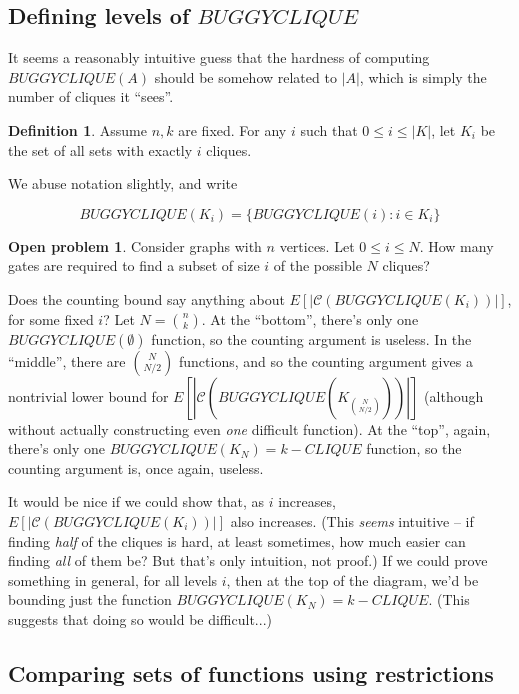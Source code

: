 \documentclass[12pt]{article}
\theoremstyle{definition}
\newtheorem{defn}{Definition}[section]
\newtheorem{prob}{Open problem}[section]
\newcommand{\bigC}[0]{\mathcal{C}}
\begin{document}
\subsection{Defining levels of $BUGGYCLIQUE$}

It seems a reasonably intuitive guess that the hardness of
computing $BUGGYCLIQUE(A)$ should be somehow related to
$|A|$, which is simply the number of cliques it ``sees''.

\begin{defn}
\label{CLIQUE-level}
Assume $n, k$ are fixed. For any $i$ such that
$0 \le i \le |K|$, let $K_i$ be the set of all sets
with exactly $i$ cliques. 
\end{defn}

We abuse notation slightly, and write

\[
BUGGYCLIQUE(K_i) = \{ BUGGYCLIQUE(i) : i \in K_i \}
\]

\begin{prob}
\label{gatesPerLevel}
Consider graphs with $n$ vertices.
Let $0 \le i \le N$.
How many gates are required to find a subset of size $i$ of the possible $N$
cliques?
\end{prob}

Does the counting bound
say anything about $E[|\bigC(BUGGYCLIQUE(K_i))|]$, for
some fixed $i$? Let $N = {n \choose k}$.
At the ``bottom'', there's only one $BUGGYCLIQUE(\emptyset)$
function, so the counting argument is useless.
In the ``middle'',
there are ${N \choose {N/2}}$ functions, and so the counting
argument gives a nontrivial lower bound for
$E[|\bigC(BUGGYCLIQUE(K_{N \choose {N/2}}))|]$ (although
without actually constructing even {\em one} difficult function).
At the ``top'', again, there's only one $BUGGYCLIQUE(K_N) = k-CLIQUE$
function,
so the counting argument is, once again, useless.

It would be nice if we could show that, as $i$ increases,
$E[|\bigC(BUGGYCLIQUE(K_i))|]$ also increases.
(This {\em seems} intuitive -- if finding {\em half} of the cliques
is hard, at least sometimes, how much easier can finding {\em all}
of them be? But that's only intuition, not proof.)
If we could prove something in general, for all levels $i$, then at
the top of the diagram, we'd be bounding just the function
$BUGGYCLIQUE(K_N) = k-CLIQUE$. (This suggests that doing so would
be difficult...)

\subsection{Comparing sets of functions using restrictions}
\end{document}
